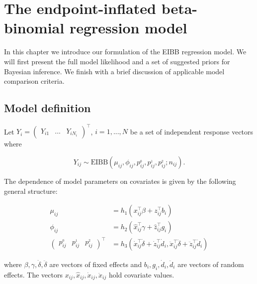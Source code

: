 \chapter{The endpoint-inflated beta-binomial regression model}
\label{cap:model}

In this chapter we introduce our formulation of the EIBB regression model. We will first present the full model likelihood and a set of suggested priors for Bayesian inference. We finish with a brief discussion of applicable model comparison criteria.

\section{Model definition}
\label{sec:defmodel}

Let $Y_i = \begin{pmatrix}Y_{i1} & ... & Y_{iN_i}\end{pmatrix}^\top$, $i = 1,...,N$ be a set of independent response vectors where

\begin{equation}
Y_{ij} \sim \mathrm{EIBB}(\mu_{ij}, \phi_{ij}, p^{_0}_{ij}, p^{_1}_{ij}, p^{_2}_{ij}; n_{ij}).
\end{equation}
	
The dependence of model parameters on covariates is given by the following general structure:

\begin{equation}
\begin{split}
\mu_{ij} &= h_1(x_{ij}^\top \beta + z_{ij}^\top b_i)\\
\phi_{ij} &= h_2(\hat{x}_{ij}^{\top} \gamma + \hat{z}_{ij}^{\top} g_i)\\
\begin{pmatrix}p_{ij}^{_0} & p_{ij}^{_1} & p_{ij}^{_2}\end{pmatrix}^\top &= h_3(\dot{x}_{ij}^{\top} \dot{\delta}+\dot{z}_{ij}^{\top} \dot{d}_i, \ddot{x}_{ij}^{\top} \ddot{\delta}+\ddot{z}_{ij}^{\top} \ddot{d}_i)
\end{split}
\label{regression-model}
\end{equation}

\noindent where $\beta, \gamma, \dot{\delta}, \ddot{\delta}$ are vectors of fixed effects and $b_i, g_i, \dot{d}_i, \ddot{d}_i$ are vectors of random effects. The vectors $x_{ij}, \hat x_{ij}, \dot x_{ij}, \ddot x_{ij}$ hold covariate values.

